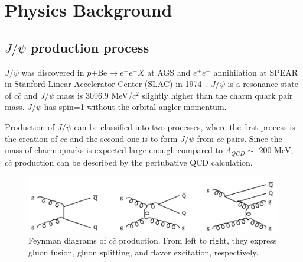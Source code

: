 \chapter{Physics Background}
\label{chap_phys}

\section{$J/\psi$ production process}
$J/\psi$ was discovered in $p$+Be$\rightarrow$$e^{+}e^{-}X$ at AGS and $e^{+}e^{-}$ annihilation at SPEAR in Stanford Linear Accelerator Center (SLAC) in 1974~\cite{bib_jpsifirst1,bib_jpsifirst2}.
$J/\psi$ is a resonance state of $c\bar{c}$ and $J/\psi$ mass is 3096.9 MeV/$c^{2}$ slightly higher than the charm quark pair mass. 
$J/\psi$ has spin=1 without the orbital angler momentum.   

Production of $J/\psi$ can be classified into two processes, where the first process is the creation of $c\bar{c}$ and the second one is to form $J/\psi$ from $c\bar{c}$ pairs.
Since the mass of charm quarks is expected large enough compared to $\Lambda_{QCD}\sim$ 200 MeV, $c\bar{c}$ production can be described by the pertubative QCD calculation. 

\begin{figure}[!h]
  \centering
  \includegraphics[width=12cm]{chap2/figure/ccbar_diagram.png}
  \caption{Feynman diagrams of $c\bar{c}$ production. From left to right, they express gluon fusion, gluon splitting, and flavor excitation, respectively. }
  \label{fig_2_jpsidiagram}
\end{figure}

